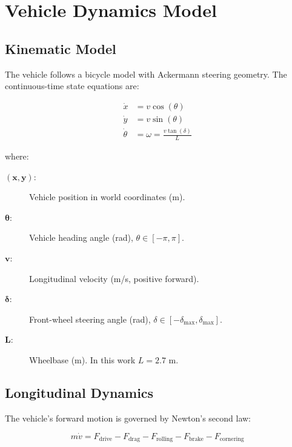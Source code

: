 \documentclass[12pt]{article}
\begin{document}
\section{Vehicle Dynamics Model}

\subsection{Kinematic Model}

The vehicle follows a bicycle model with Ackermann steering geometry. The continuous-time state equations are:

\begin{align}
\dot{x} &= v \cos(\theta) \label{eq:kinematics_x}\\
\dot{y} &= v \sin(\theta) \label{eq:kinematics_y}\\
\dot{\theta} &= \omega = \frac{v \tan(\delta)}{L} \label{eq:kinematics_theta}
\end{align}

where:

\begin{description}
    \item[\(\boldsymbol{(x, y)}:\)] Vehicle position in world coordinates (m).
    \item[\(\boldsymbol{\theta}:\)] Vehicle heading angle (rad), $\theta \in [-\pi, \pi]$.
    \item[\(\boldsymbol{v}:\)] Longitudinal velocity (m/s, positive forward).
    \item[\(\boldsymbol{\delta}:\)] Front-wheel steering angle (rad), $\delta \in [-\delta_{\max}, \delta_{\max}]$.
    \item[\(\boldsymbol{L}:\)] Wheelbase (m). In this work $L = 2.7$ m.
\end{description}


\subsection{Longitudinal Dynamics}

The vehicle's forward motion is governed by Newton's second law:

\begin{equation}
m \dot{v} = F_{\text{drive}} - F_{\text{drag}} - F_{\text{rolling}} - F_{\text{brake}} - F_{\text{cornering}}
\end{equation}
\end{document}
